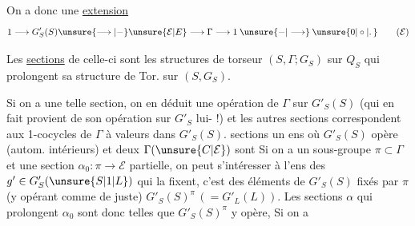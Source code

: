 On a donc une \uline{extension}
\[
1\longrightarrow G'_S(S)\unsure{\longrightarrow|\mathbin{-}}\unsure{\mathcal E|E}\longrightarrow\Gamma\longrightarrow1\mathbin{\unsure{-|\longrightarrow}}\unsure{0|\circ|\ldotp}
\tag*{($\mathcal E$)}
\]


Les \uline{sections} de celle-ci sont les structures de torseur  $(S,\Gamma;G_S)$ sur $Q_S$ qui prolongent sa structure de Tor. sur $(S,G_S)$.

Si on a une telle section, on en déduit une opération de $\Gamma$ sur $G'_S(S)$ (qui en fait provient de son opération sur $G'_S$ lui- !) et les autres sections correspondent aux 1-cocycles de $\Gamma$ à valeurs dans $G'_S(S)$.  sections   un ens où $G'_S(S)$ opère (autom. intérieurs) et deux  $\Gamma(\unsure{C|\mathcal E})$ sont  Si on a un sous-groupe $\pi\subset\Gamma$ et une section $\alpha_0:\pi\longrightarrow\mathcal E$ partielle, on peut s’intéresser à l’ens des $g'\in G'_S(\unsure{S|1|L})$ qui la fixent, c’est  des éléments de $G'_S(S)$ fixés par $\pi$ (y opérant comme de juste) $G'_S(S)^\pi\,(=\!G'_L(L))$. Les sections $\alpha$ qui prolongent $\alpha_0$ sont donc telles que $G'_S(S)^\pi$ y opère, Si on a

